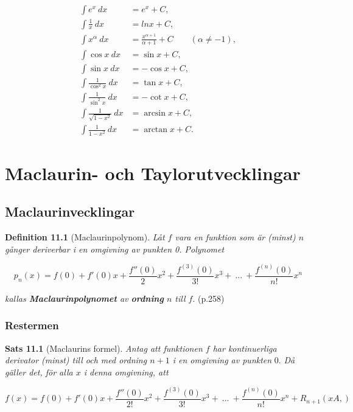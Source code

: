\documentclass[11pt]{article}
\begin{document}
\begin{align}
    \int e^{x}\ dx &= e^x + C,\\
    \int \frac{1}{x}\ dx &= ln x + C,\\
    \int x^{\alpha}\ dx &= \frac{x^{\alpha + 1}}{\alpha + 1} + C \qquad (\alpha \neq -1),\\
    \int \cos x\ dx &= \sin x + C,\\
    \int \sin x\ dx &= -\cos x + C,\\
    \int \frac{1}{\cos^2 x}\ dx &= \tan x + C,\\
    \int \frac{1}{\sin^2 x}\ dx &= -\cot x + C,\\
    \int \frac{1}{\sqrt{1 - x^2}}\ dx &= \arcsin x + C,\\
    \int \frac{1}{1 - x^2}\ dx &= \arctan x + C.
\end{align}

\newpage
\section{Maclaurin- och Taylorutvecklingar}

\subsection{Maclaurinvecklingar}

\textbf{Definition 11.1} (Maclaurinpolynom). \textit{Låt $f$ vara en funktion som är (minst) $n$ gånger deriverbar i en omgivning av punkten 0. Polynomet}

\begin{equation}
    p_n(x) = f(0) + f'(0)x + \frac{f''(0)}{2}x^2 + \frac{f^{(3)}(0)}{3!}x^3 +\ ...\ + \frac{f^{(n)}(0)}{n!}x^n
    \label{eq:maclaurinpolynom}
\end{equation}

\textit{kallas \textbf{Maclaurinpolynomet} av \textbf{ordning} $n$ till $f$}. (p.258)

\subsubsection{Restermen}

\textbf{Sats 11.1} (Maclaurins formel). \textit{Antag att funktionen $f$ har kontinuerliga derivator (minst) till och med ordning $n + 1$ i en omgivning av punkten} 0. \textit{Då gäller det, för alla $x$ i denna omgivning, att}

\begin{equation}
    f(x) = f(0) + f'(0)x + \frac{f''(0)}{2!}x^2 + \frac{f^{(3)}(0)}{3!}x^3 +\ ...\ + \frac{f^{(n)}(0)}{n!}x^n + R_{n + 1}(xA,)
    \label{eq:maclaurinpolynom_och_rest}
\end{equation}
\end{document}
